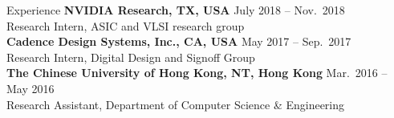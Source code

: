 
\begin{rSection}{Experience}
{\bf NVIDIA Research, TX, USA}               \hfill { July 2018 -- Nov.~2018} \\
Research Intern, ASIC and VLSI research group\\

{\bf Cadence Design Systems, Inc., CA, USA}               \hfill { May 2017 -- Sep.~2017} \\
Research Intern, Digital Design and Signoff Group\\

{\bf The Chinese University of Hong Kong, NT, Hong Kong}  \hfill { Mar.~2016 -- May 2016} \\ 
Research Assistant, Department of Computer Science \& Engineering \\

\end{rSection}


